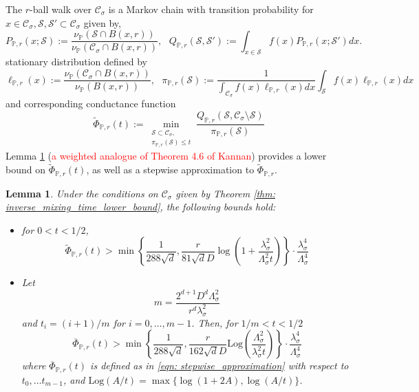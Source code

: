 \documentclass{article}
\newcommand{\1}{\mathbf{1}}
\newcommand{\Log}{\mathrm{Log}}
\newcommand{\Pbb}{\mathbb{P}}
\newcommand{\Sset}{\mathcal{S}}
\newcommand{\Cset}{\mathcal{C}}
\newcommand{\Csig}{\Cset_{\sigma}}
\theoremstyle{aldenthm}
\newtheorem{lemma}{Lemma}
\begin{document}
The $r$-ball walk over $\Csig$ is a Markov chain with transition probability for $x \in \Csig, \Sset, \Sset' \subset \Csig$ given by,
\begin{equation*}
P_{\Pbb, r}(x;\Sset) := \frac{\nu_\Pbb(\Sset \cap B(x,r))}{\nu_\Pbb(\Csig \cap B(x,r))}, ~~~ Q_{\Pbb, r}(\Sset, \Sset') := \int_{x \in \Sset} f(x) P_{\Pbb, r}(x;\Sset') dx. 
\end{equation*}
stationary distribution defined by
\begin{equation*}
\ell_{\Pbb,r}(x) := \frac{\nu_\Pbb(\Csig \cap B(x,r))}{\nu_{\Pbb}(B(x,r))}, ~~~ \pi_{\Pbb,r}(\Sset) := \frac{1}{\int_{\Csig} f(x) \ell_{\Pbb,r}(x) dx} \int_{\Sset} f(x) \ell_{\Pbb,r}(x) dx
\end{equation*}
and corresponding conductance function
\begin{equation*}
\widetilde{\Phi}_{\Pbb,r}(t) := \min_{\substack{\Sset \subset \Csig, \\ \pi_{\Pbb,r}(\Sset) \leq t} } \frac{Q_{\Pbb,r}(\Sset, \Csig \setminus \Sset)}{\pi_{\Pbb,r}(\Sset)}
\end{equation*}
Lemma \ref{lem: continuous_conductance_lb} (\textcolor{red}{a weighted analogue of Theorem 4.6 of Kannan}) provides a lower bound on $\widetilde{\Phi}_{\Pbb, r}(t)$, as well as a stepwise approximation to $\widetilde{\Phi}_{\Pbb, r}$.
\begin{lemma}
	\label{lem: continuous_conductance_lb}
	Under the conditions on $\Csig$ given by Theorem \ref{thm: inverse_mixing_time_lower_bound}, the following bounds hold: 
	\begin{itemize}
		\item 
		for $0 < t < 1/2$,
		\begin{equation*}
		\widetilde{\Phi}_{\Pbb,r}(t) > \min\left\{\frac{1}{288\sqrt{d}},\frac{r}{81 \sqrt{d}D}\log\left(1 + \frac{\lambda_{\sigma}^2}{\Lambda_{\sigma}^2 t}\right)\right\} \cdot \frac{\lambda_{\sigma}^4}{\Lambda_{\sigma}^4}
		\end{equation*}
		\item
		Let
		\begin{equation*}
		m = \frac{2^{d+1}D^d \Lambda_{\sigma}^2}{r^d \lambda_{\sigma}^2}
		\end{equation*}
		 and $t_i = (i + 1)/m$ for $i = 0, \ldots, m - 1$. Then, for $1/m < t < 1/2$
		\begin{equation*}
		\overline{\Phi}_{\Pbb,r}(t) > \min\left\{\frac{1}{288\sqrt{d}},\frac{r}{162 \sqrt{d}D}\Log\left( \frac{\Lambda_{\sigma}^2}{\lambda_{\sigma}^2 t}\right)\right\} \cdot \frac{\lambda_{\sigma}^4}{\Lambda_{\sigma}^4}
		\end{equation*}
		where $\overline{\Phi}_{\Pbb,r}(t)$ is defined as in \eqref{eqn: stepwise_approximation} with respect to $t_0, \ldots t_{m - 1}$, and $\Log(A/t) = \max\{\log(1 + 2A), \log(A/t)\}$.
	\end{itemize}
	
\end{lemma}
\end{document}
